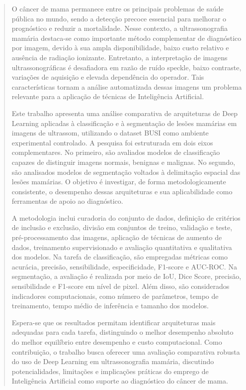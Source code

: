 \documentclass[tcc,capa]{texufpel}
\begin{document}
\begin{abstract}
O câncer de mama permanece entre os principais problemas de saúde pública no mundo, sendo a detecção precoce essencial para melhorar o prognóstico e reduzir a mortalidade. Nesse contexto, a ultrassonografia mamária destaca-se como importante método complementar de diagnóstico por imagem, devido à sua ampla disponibilidade, baixo custo relativo e ausência de radiação ionizante. Entretanto, a interpretação de imagens ultrassonográficas é desafiadora em razão de ruído speckle, baixo contraste, variações de aquisição e elevada dependência do operador. Tais características tornam a análise automatizada dessas imagens um problema relevante para a aplicação de técnicas de Inteligência Artificial.

Este trabalho apresenta uma análise comparativa de arquiteturas de Deep Learning aplicadas à classificação e à segmentação de lesões mamárias em imagens de ultrassom, utilizando o dataset BUSI como ambiente experimental controlado. A pesquisa foi estruturada em dois eixos complementares. No primeiro, são avaliados modelos de classificação capazes de distinguir imagens normais, benignas e malignas. No segundo, são analisados modelos de segmentação voltados à delimitação espacial das lesões mamárias. O objetivo é investigar, de forma metodologicamente consistente, o desempenho dessas arquiteturas e sua aplicabilidade como ferramentas de apoio ao diagnóstico.

A metodologia inclui curadoria do conjunto de dados, definição de critérios de inclusão e exclusão, divisão em conjuntos de treino, validação e teste, pré-processamento das imagens, aplicação de técnicas de aumento de dados, treinamento supervisionado e avaliação quantitativa e qualitativa dos modelos. Na tarefa de classificação, são empregadas métricas como acurácia, precisão, sensibilidade, especificidade, F1-score e AUC-ROC. Na segmentação, a avaliação é realizada por meio de IoU, Dice Score, precisão, sensibilidade e F1-score em nível de pixel. Além disso, são considerados indicadores computacionais, como número de parâmetros, tempo de treinamento, tempo médio de inferência e tamanho dos modelos.

Espera-se que os resultados permitam identificar arquiteturas mais adequadas para cada tarefa, distinguindo o melhor desempenho absoluto do melhor equilíbrio entre desempenho e custo computacional. Como contribuição, o trabalho busca oferecer uma avaliação comparativa robusta do uso de Deep Learning em ultrassonografia mamária, discutindo potencialidades, limitações e implicações práticas do emprego de Inteligência Artificial como suporte ao diagnóstico do câncer de mama.
\end{abstract}
\end{document}
